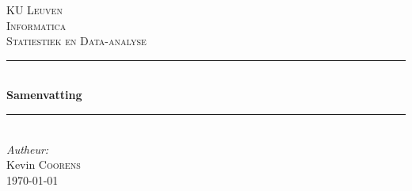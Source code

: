 \newcommand{\HRule}{\rule{\linewidth}{0.5mm}} 
\center 
\textsc{\LARGE KU Leuven}\\[1.5cm] 
\textsc{\Large Informatica}\\[0.5cm] 
\textsc{\large Statiestiek en Data-analyse}\\[0.5cm]
\HRule \\[0.4cm]
{ \huge \bfseries Samenvatting}\\[0.4cm]\HRule \\[1.5cm]
\Large \emph{Autheur:}\\
Kevin \textsc{Coorens}\\[3cm]
{\large \today}\\[2cm] 
\vfill
